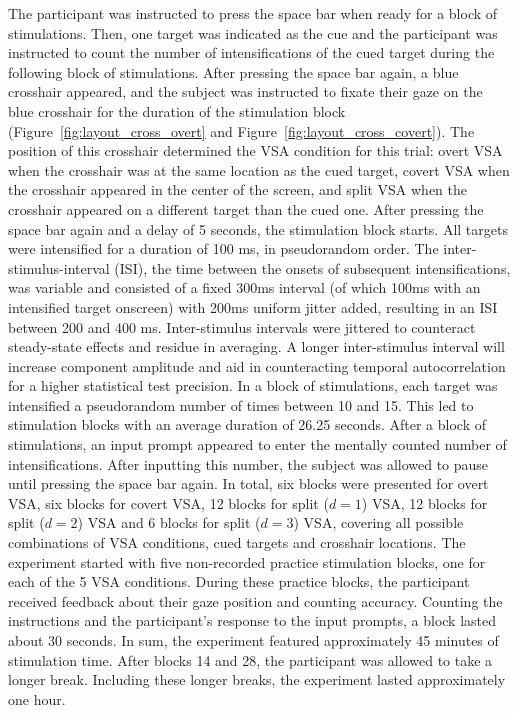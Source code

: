 The participant was instructed to press the space bar when ready for a block
of stimulations.
Then, one target was indicated as the cue and the participant
was instructed to count the number of intensifications of the cued target
during the following block of stimulations.
After pressing the space bar again, a blue crosshair appeared, and the subject
was instructed to fixate their gaze on the blue crosshair for the duration of
the stimulation block (Figure~\ref{fig:layout_cross_overt} and Figure~\ref{fig:layout_cross_covert}).
The position of this crosshair determined the VSA condition for this trial:
overt VSA when the crosshair was at the same location as the cued target,
covert VSA when the crosshair appeared in the center of the screen, and split
VSA when the crosshair appeared on a different target than the cued one.
After pressing the space bar again and a delay of 5 seconds, the stimulation block
starts.
All targets were intensified for a duration of 100 ms, in pseudorandom order.
The inter-stimulus-interval (ISI), the time between the onsets of subsequent intensifications,
was variable and consisted of a fixed 300ms interval (of which 100ms with an intensified target onscreen)
with 200ms uniform jitter added, resulting in an ISI
between 200 and 400 ms.
Inter-stimulus intervals were jittered to counteract steady-state effects and residue in averaging. A
longer inter-stimulus interval will increase component amplitude and aid in counteracting temporal
autocorrelation for a higher statistical test precision.
In a block of stimulations, each target was intensified a pseudorandom number of times between 10 and 15.
This led to stimulation blocks with an average duration of 26.25 seconds. After a block of stimulations, an
input prompt appeared to enter the mentally counted number of intensifications.
After inputting this number, the subject was allowed to pause until pressing the space bar again.
In total, six blocks were presented for overt VSA, six blocks for covert VSA, 12 blocks for
split ($d=1$) VSA, 12 blocks for split ($d=2$) VSA and 6 blocks for split
($d=3$) VSA, covering all possible combinations of VSA conditions, cued targets and
crosshair locations.
The experiment started with five non-recorded practice stimulation blocks, one for
each of the 5 VSA conditions.
During these practice blocks, the participant received feedback about their gaze
position and counting accuracy.
Counting the instructions and the participant's response to the
input prompts, a block lasted about 30
seconds. In sum, the experiment featured approximately 45 minutes of
stimulation time.
After blocks 14 and 28, the participant was allowed to take a longer break.
Including these longer breaks, the experiment lasted approximately one hour.
